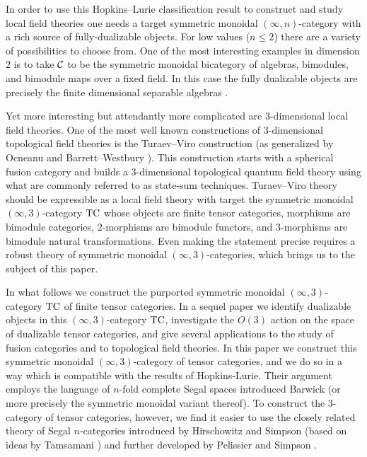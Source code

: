\documentclass[a4paper]{amsart}
\begin{document}
In order to use this Hopkins--Lurie classification result to construct and study local field theories one needs a target symmetric monoidal $(\infty, n)$-category with a rich source of fully-dualizable objects. For low values ($n\leq 2$) there are a variety of possibilities to choose from. One of the most interesting examples in dimension $2$ is to take $\mathcal C$ to be the symmetric monoidal bicategory of algebras, bimodules, and bimodule maps over a fixed field. In this case the fully dualizable objects are precisely the finite dimensional separable algebras \cite[\S A.3]{schommer-pries-thesis}.

Yet more interesting but attendantly more complicated are 3-dimensional local field theories.  One of the most well known constructions of 3-dimensional topological field theories is the Turaev--Viro \cite{MR1191386, MR1292673} construction (as generalized by Ocneanu \cite{MR1317353} and Barrett--Westbury \cite{MR1686423}). This construction starts with a spherical fusion category and builds a 3-dimensional topological quantum field theory using what are commonly referred to as state-sum techniques.  Turaev--Viro theory should be expressible as a local field theory with target the symmetric monoidal $(\infty,3)$-category $\mathrm{TC}$ whose objects are finite tensor categories, morphisms are bimodule categories, $2$-morphisms are bimodule functors, and $3$-morphisms are bimodule natural transformations.  Even making the statement precise requires a robust theory of symmetric monoidal $(\infty,3)$-categories, which brings us to the subject of this paper.  %

In what follows we construct the purported symmetric monoidal $(\infty,3)$-category $\mathrm{TC}$ of finite tensor categories. In a sequel paper \cite{DSPS} we identify dualizable objects in this $(\infty, 3)$-category $\mathrm{TC}$, investigate the $O(3)$ action on the space of dualizable tensor categories, and give several applications to the study of fusion categories and to topological field theories.  In this paper we construct this symmetric monoidal $(\infty,3)$-category of tensor categories, and we do so in a way which is compatible with the results of Hopkins-Lurie.  Their argument employs the language of $n$-fold complete Segal spaces introduced Barwick \cite{Barwick:thesis} (or more precisely the symmetric monoidal variant thereof). To construct the 3-category of tensor categories, however, we find it easier to use the closely related theory of Segal $n$-categories introduced by Hirschowitz and Simpson \cite{9807049} (based on ideas by Tamsamani \cite{Tamsamani:thesis}) and further developed by Pelissier \cite{Pelissier:thesis} and Simpson \cite{1001.4071}.  %
\end{document}
